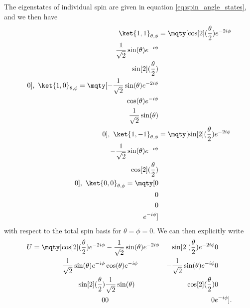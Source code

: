 The eigenstates of individual spin are given in equation \ref{eq:spin_angle_states}, and we then have
\begin{align*}
	\ket{1, 1}_{\theta, \phi} &= \mqty[
		\cos[2](\frac{\theta}{2})e^{-2i\phi} \\
		\frac{1}{\sqrt{2}}\sin(\theta)e^{-i\phi} \\
		\sin[2](\frac{\theta}{2}) \\
		0
	],\ \ket{1, 0}_{\theta, \phi} = \mqty[
		-\frac{1}{\sqrt{2}}\sin(\theta)e^{-2i\phi} \\
		\cos(\theta)e^{-i\phi} \\
		\frac{1}{\sqrt{2}}\sin(\theta) \\
		0
	],\ \ket{1, -1}_{\theta, \phi} &= \mqty[
		\sin[2](\frac{\theta}{2})e^{-2i\phi} \\
		-\frac{1}{\sqrt{2}}\sin(\theta)e^{-i\phi} \\
		\cos[2](\frac{\theta}{2}) \\
		0
	],\ \ket{0, 0}_{\theta, \phi} = \mqty[
		0 \\
		0 \\
		0 \\
		e^{-i\phi}
	]
\end{align*}
with respect to the total spin basis for $\theta = \phi = 0$. We can then explicitly write
\begin{align*}
	U = \mqty[
		\cos[2](\frac{\theta}{2})e^{-2i\phi} & -\frac{1}{\sqrt{2}}\sin(\theta)e^{-2i\phi} & \sin[2](\frac{\theta}{2})e^{-2i\phi} & 0 \\
		\frac{1}{\sqrt{2}}\sin(\theta)e^{-i\phi} & \cos(\theta)e^{-i\phi} & -\frac{1}{\sqrt{2}}\sin(\theta)e^{-i\phi} & 0 \\
		\sin[2](\frac{\theta}{2}) & \frac{1}{\sqrt{2}}\sin(\theta) & \cos[2](\frac{\theta}{2}) & 0 \\
		0 & 0 & 0 & e^{-i\phi}
	].
\end{align*}

